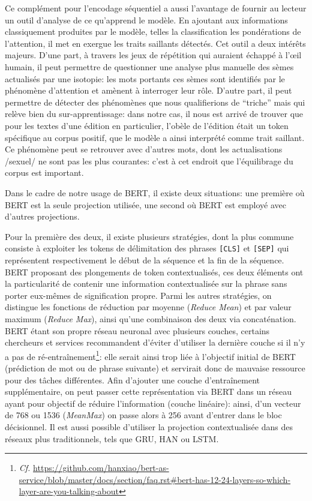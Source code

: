 Ce complément pour l'encodage séquentiel a aussi l'avantage de fournir au lecteur un outil d'analyse de ce qu'apprend le modèle. En ajoutant aux informations classiquement produites par le modèle, telles la classification les pondérations de l'attention, il met en exergue les traits saillants détectés. Cet outil a deux intérêts majeurs. D'une part, à travers les jeux de répétition qui auraient échappé à l'œil humain, il peut permettre de questionner une analyse plus manuelle des sèmes actualisés par une isotopie: les mots portants ces sèmes sont identifiés par le phénomène d'attention et amènent à interroger leur rôle. D'autre part, il peut permettre de détecter des phénomènes que nous qualifierions de \enquote{triche} mais qui relève bien du sur-apprentissage: dans notre cas, il nous est arrivé de trouver que pour les textes d'une édition en particulier, l'obèle de l'édition était un token spécifique au corpus positif, que le modèle a ainsi interprété comme trait saillant. Ce phénomène peut se retrouver avec d'autres mots, dont les actualisations /sexuel/ ne sont pas les plus courantes: c'est à cet endroit que l'équilibrage du corpus est important.

Dans le cadre de notre usage de BERT, il existe deux situations: une première où BERT est la seule projection utilisée, une second où BERT est employé avec d'autres projections.

Pour la première des deux, il existe plusieurs stratégies, dont la plus commune consiste à exploiter les tokens de délimitation des phrases \texttt{[CLS]} et \texttt{[SEP]} qui représentent respectivement le début de la séquence et la fin de la séquence. BERT proposant des plongements de token contextualisés, ces deux éléments ont la particularité de contenir une information contextualisée sur la phrase sans porter eux-mêmes de signification propre. Parmi les autres stratégies, on distingue les fonctions de réduction par moyenne (\textit{Reduce Mean}) et par valeur maximum (\textit{Reduce Max}), ainsi qu'une combinaison des deux via concaténation. BERT étant son propre réseau neuronal avec plusieurs couches, certains chercheurs et services recommandent d'éviter d'utiliser la dernière couche si il n'y a pas de ré-entraînement\footnote{\textit{Cf.} \url{https://github.com/hanxiao/bert-as-service/blob/master/docs/section/faq.rst\#bert-has-12-24-layers-so-which-layer-are-you-talking-about}}: elle serait ainsi trop liée à l'objectif initial de BERT (prédiction de mot ou de phrase suivante) et servirait donc de mauvaise ressource pour des tâches différentes. Afin d'ajouter une couche d'entraînement supplémentaire, on peut passer cette représentation via BERT dans un réseau ayant pour objectif de réduire l'information (couche linéaire): ainsi, d'un vecteur de 768 ou 1536 (\textit{MeanMax}) on passe alors à 256 avant d'entrer dans le bloc décisionnel. Il est aussi possible d'utiliser la projection contextualisée dans des réseaux plus traditionnels, tels que GRU, HAN ou LSTM.

